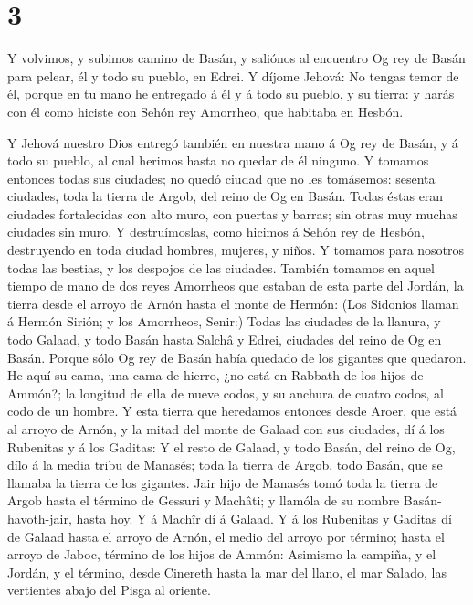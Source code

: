 \hypertarget{section-2}{%
\section{3}\label{section-2}}

 Y volvimos, y subimos camino de Basán, y saliónos al
encuentro Og rey de Basán para pelear, él y todo su pueblo, en Edrei.
 Y díjome Jehová: No tengas temor de él, porque en tu mano
he entregado á él y á todo su pueblo, y su tierra: y harás con él como
hiciste con Sehón rey Amorrheo, que habitaba en Hesbón.

 Y Jehová nuestro Dios entregó también en nuestra mano á Og
rey de Basán, y á todo su pueblo, al cual herimos hasta no quedar de él
ninguno.  Y tomamos entonces todas sus ciudades; no quedó
ciudad que no les tomásemos: sesenta ciudades, toda la tierra de Argob,
del reino de Og en Basán.  Todas éstas eran ciudades
fortalecidas con alto muro, con puertas y barras; sin otras muy muchas
ciudades sin muro.  Y destruímoslas, como hicimos á Sehón
rey de Hesbón, destruyendo en toda ciudad hombres, mujeres, y niños.
 Y tomamos para nosotros todas las bestias, y los despojos
de las ciudades.  También tomamos en aquel tiempo de mano de
dos reyes Amorrheos que estaban de esta parte del Jordán, la tierra
desde el arroyo de Arnón hasta el monte de Hermón:  (Los
Sidonios llaman á Hermón Sirión; y los Amorrheos, Senir:) 
Todas las ciudades de la llanura, y todo Galaad, y todo Basán hasta
Salchâ y Edrei, ciudades del reino de Og en Basán.  Porque
sólo Og rey de Basán había quedado de los gigantes que quedaron. He aquí
su cama, una cama de hierro, ¿no está en Rabbath de los hijos de Ammón?;
la longitud de ella de nueve codos, y su anchura de cuatro codos, al
codo de un hombre.  Y esta tierra que heredamos entonces
desde Aroer, que está al arroyo de Arnón, y la mitad del monte de Galaad
con sus ciudades, dí á los Rubenitas y á los Gaditas:  Y el
resto de Galaad, y todo Basán, del reino de Og, dílo á la media tribu de
Manasés; toda la tierra de Argob, todo Basán, que se llamaba la tierra
de los gigantes.  Jair hijo de Manasés tomó toda la tierra
de Argob hasta el término de Gessuri y Machâti; y llamóla de su nombre
Basán-havoth-jair, hasta hoy.  Y á Machîr dí á Galaad.
 Y á los Rubenitas y Gaditas dí de Galaad hasta el arroyo
de Arnón, el medio del arroyo por término; hasta el arroyo de Jaboc,
término de los hijos de Ammón:  Asimismo la campiña, y el
Jordán, y el término, desde Cinereth hasta la mar del llano, el mar
Salado, las vertientes abajo del Pisga al oriente.

